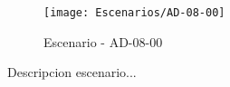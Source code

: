 \begin{figure}[H]
\centering
\texttt{[image: Escenarios/AD-08-00]}
\caption{Escenario - AD-08-00}
\label{fig:AD-08-00}
\end{figure}

Descripcion escenario...
\clearpage
